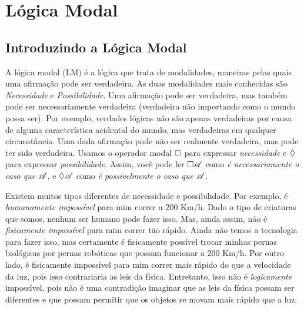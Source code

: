 
\part{Lógica Modal}
\label{ch.ML}

%

\chapter{Introduzindo a  L\'ogica Modal}
\label{Intro}

A lógica modal (LM) é a lógica que trata de modalidades, maneiras pelas quais uma afirmação pode ser verdadeira. As duas modalidades mais conhecidas são   \emph{Necessidade} e \emph{Possibilidade}.   Uma afirmação pode ser verdadeira, mas também pode ser necessariamente verdadeira (verdadeira não importando como o mundo possa ser). Por exemplo, verdades lógicas não são apenas verdadeiras por causa de alguma característica acidental do mundo, mas verdadeiras em qualquer circunstância. Uma dada afirmação pode não ser realmente verdadeira, mas pode ter sido verdadeira. 
Usamos o operador modal $\Box$ para expressar \emph{necessidade} e $\Diamond$ para expressar \emph{possibilidade}. Assim, você pode ler $\Box\mathscr{A}$ como \emph{é necessariamente o caso que} $\mathscr{A}$, e $\Diamond\mathscr{A}$ como \emph{é possivelmente o caso que}  $\mathscr{A}$.


Existem muitos tipos diferentes de necessidade e possibilidade.  Por exemplo, é    \emph{humanamente impossível} para mim correr a 200 Km/h.  Dado o tipo de criaturas que somos, nenhum ser humano pode fazer isso. Mas,  ainda assim, não é  \emph{fisicamente impossível} para mim correr tão rápido. Ainda não temos a tecnologia para fazer isso, mas certamente é fisicamente possível trocar minhas pernas biológicas por pernas robóticas que possam funcionar a 200 Km/h. Por outro lado, é fisicamente impossível para mim correr mais rápido do que a velocidade da luz, pois isso contrariaria as leis da física. Entretanto, isso não é  \emph{logicamente} impossível, pois não é uma contradição imaginar que as leis da física possam ser diferentes e que possam permitir que os objetos se movam mais rápido que a luz.


